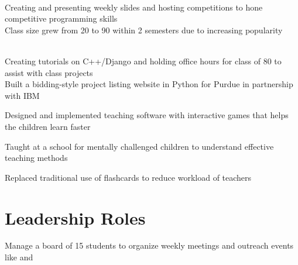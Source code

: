 \documentclass[]{resume_openfont}
\begin{document}
\begin{minipage}[t]{0.66\textwidth}
\begin{tightemize}
\item {}  \\ 
\textbullet{} Creating and presenting weekly slides and hosting competitions to hone competitive programming skills \\
\textbullet{} Class size grew from 20 to 90 within 2 semesters due to increasing popularity\\
\item {}\\
\textbullet{} Creating tutorials on C++/Django and holding office hours for class of 80 to assist with class projects \\
\textbullet{} Built a bidding-style project listing website in Python for Purdue in partnership with IBM \\
\end{tightemize}
\sectionsep

\begin{tightemize}
\item Designed and implemented teaching software with interactive games that helps the children learn faster
\item Taught at a school for mentally challenged children to understand effective teaching methods
\item Replaced traditional use of flashcards to reduce workload of teachers
\end{tightemize}
\sectionsep


\section{Leadership Roles}

\begin{tightemize}
\item Manage a board of 15 students to organize weekly meetings and outreach events like  and 
\end{tightemize}
\sectionsep


\end{minipage} 
\end{document}
